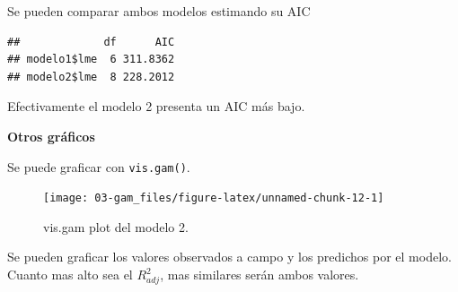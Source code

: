 \documentclass[
]{book}
\newenvironment{Shaded}{\begin{snugshade}}{\end{snugshade}}
\newcommand{\AttributeTok}[1]{\textcolor[rgb]{0.77,0.63,0.00}{#1}}
\newcommand{\CommentTok}[1]{\textcolor[rgb]{0.56,0.35,0.01}{\textit{#1}}}
\newcommand{\DecValTok}[1]{\textcolor[rgb]{0.00,0.00,0.81}{#1}}
\newcommand{\FunctionTok}[1]{\textcolor[rgb]{0.00,0.00,0.00}{#1}}
\newcommand{\NormalTok}[1]{#1}
\newcommand{\SpecialCharTok}[1]{\textcolor[rgb]{0.00,0.00,0.00}{#1}}
\newcommand{\StringTok}[1]{\textcolor[rgb]{0.31,0.60,0.02}{#1}}
\begin{document}
Se pueden comparar ambos modelos estimando su AIC

\begin{Shaded}
\end{Shaded}

\begin{verbatim}
##             df      AIC
## modelo1$lme  6 311.8362
## modelo2$lme  8 228.2012
\end{verbatim}

Efectivamente el modelo 2 presenta un AIC más bajo.

\textbf{Otros gráficos}

Se puede graficar con \texttt{vis.gam()}.

\begin{Shaded}
\end{Shaded}

\begin{figure}

{\centering \texttt{[image: 03-gam\_files/figure-latex/unnamed-chunk-12-1]} 

}

\caption{vis.gam plot del modelo 2.}\label{fig:unnamed-chunk-12}
\end{figure}

Se pueden graficar los valores observados a campo y los predichos por el modelo. Cuanto mas alto sea el \(R_{adj}^{2}\), mas similares serán ambos valores.
\end{document}
